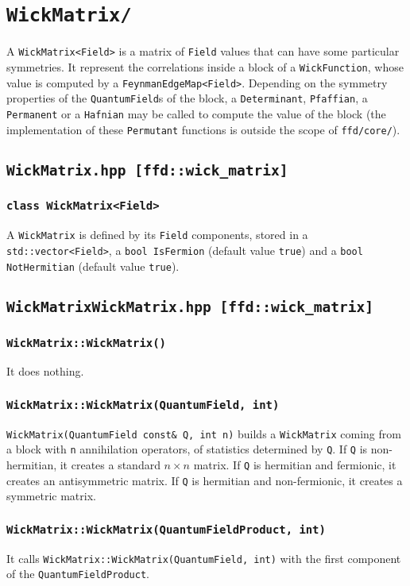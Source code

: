 \chapter{\texttt{WickMatrix/}}
A \texttt{WickMatrix<Field>} is a matrix of \texttt{Field} values that can have some particular symmetries. It represent the correlations inside a block of a \texttt{WickFunction}, whose value is computed by a \texttt{FeynmanEdgeMap<Field>}. Depending on the symmetry properties of the \texttt{QuantumField}s of the block, a \texttt{Determinant}, \texttt{Pfaffian}, a \texttt{Permanent} or a \texttt{Hafnian} may be called to compute the value of the block (the implementation of these \texttt{Permutant} functions is outside the scope of \texttt{ffd/core/}).
\section{\texttt{WickMatrix.hpp [ffd::wick\_matrix]}}
\subsection{\texttt{class WickMatrix<Field>}}
A \texttt{WickMatrix} is defined by its \texttt{Field} components, stored in a \texttt{std::vector<Field>}, a \texttt{bool IsFermion} (default value \texttt{true}) and a \texttt{bool NotHermitian} (default value \texttt{true}).
\section{\texttt{WickMatrixWickMatrix.hpp [ffd::wick\_matrix]}}
\subsection{\texttt{WickMatrix::WickMatrix()}}
It does nothing.
\subsection{\texttt{WickMatrix::WickMatrix(QuantumField, int)}}
\texttt{WickMatrix(QuantumField const\& Q, int n)} builds a \texttt{WickMatrix} coming from a block with \texttt{n} annihilation operators, of statistics determined by \texttt{Q}. If \texttt{Q} is non-hermitian, it creates a standard $n\times n$ matrix. If \texttt{Q} is hermitian and fermionic, it creates an antisymmetric matrix. If \texttt{Q} is hermitian and non-fermionic, it creates a symmetric matrix.
\subsection{\texttt{WickMatrix::WickMatrix(QuantumFieldProduct, int)}}
It calls \texttt{WickMatrix::WickMatrix(QuantumField, int)} with the first component of the \texttt{QuantumFieldProduct}.
